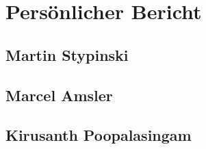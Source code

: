 \newpage

\chapter{Persönlicher Bericht}


\section{Martin Stypinski}


\section{Marcel Amsler}


\newpage
\section{Kirusanth Poopalasingam}

